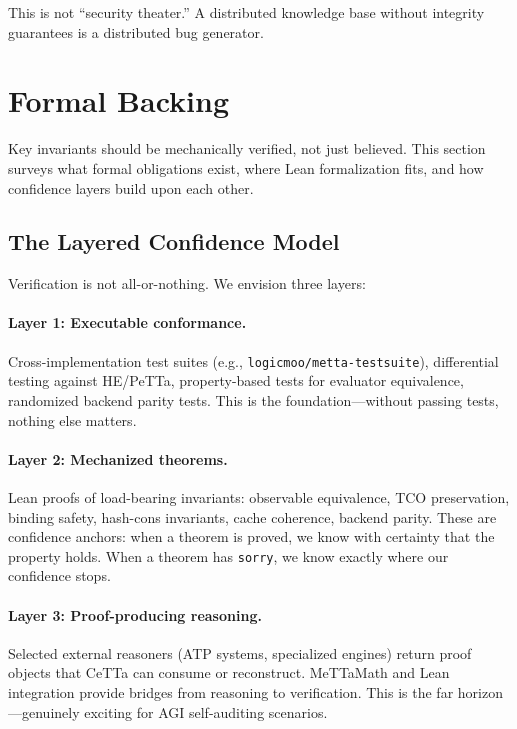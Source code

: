 \documentclass[11pt]{article}
\newcommand{\code}[1]{\texttt{#1}}
\newcommand{\PeTTa}{\textup{PeTTa}}
\newcommand{\HE}{\textup{HE}}
\newcommand{\CeTTa}{\textup{CeTTa}}
\begin{document}
This is not ``security theater.''  A distributed knowledge base without
integrity guarantees is a distributed bug generator.

\section{Formal Backing}
\label{sec:formal}

Key invariants should be mechanically verified, not just believed.
This section surveys what formal obligations exist, where Lean
formalization fits, and how confidence layers build upon each other.

\subsection{The Layered Confidence Model}

Verification is not all-or-nothing.  We envision three layers:

\paragraph{Layer 1: Executable conformance.}
Cross-implementation test suites (e.g., \code{logicmoo/metta-testsuite}),
differential testing against \HE{}/\PeTTa{}, property-based tests for
evaluator equivalence, randomized backend parity tests.  This is the
foundation---without passing tests, nothing else matters.

\paragraph{Layer 2: Mechanized theorems.}
Lean proofs of load-bearing invariants: observable equivalence, TCO
preservation, binding safety, hash-cons invariants, cache coherence,
backend parity.  These are confidence anchors: when a theorem is proved,
we know with certainty that the property holds.  When a theorem has
\code{sorry}, we know exactly where our confidence stops.

\paragraph{Layer 3: Proof-producing reasoning.}
Selected external reasoners (ATP systems, specialized engines) return
proof objects that \CeTTa{} can consume or reconstruct.  MeTTaMath and
Lean integration provide bridges from reasoning to verification.  This
is the far horizon---genuinely exciting for AGI self-auditing scenarios.
\end{document}
